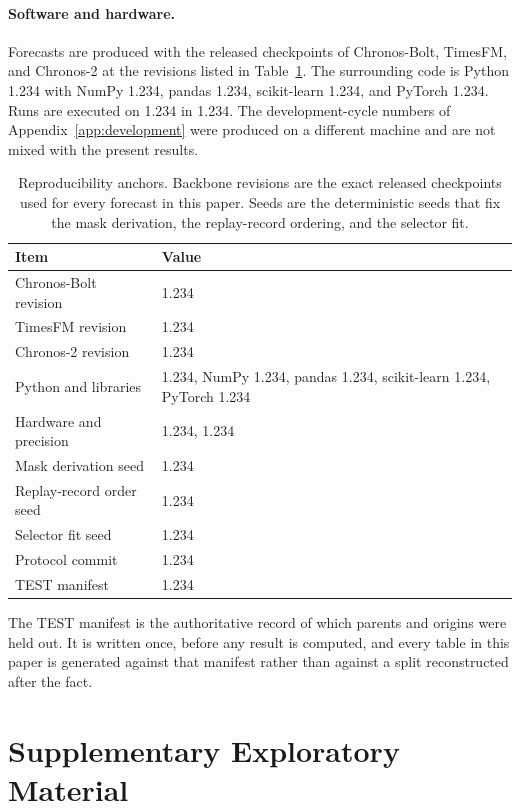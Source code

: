 \documentclass{article}
\begin{document}
\paragraph{Software and hardware.} Forecasts are produced with the released checkpoints of
Chronos-Bolt, TimesFM, and Chronos-2 at the revisions listed in Table~\ref{tab:app-repro}.
The surrounding code is Python 1.234 with NumPy 1.234, pandas
1.234, scikit-learn 1.234, and PyTorch 1.234. Runs are
executed on 1.234 in 1.234. The development-cycle numbers of
Appendix~\ref{app:development} were produced on a different machine and are not mixed with the
present results.

\begin{table}[h]
  \caption{Reproducibility anchors. Backbone revisions are the exact released checkpoints used
  for every forecast in this paper. Seeds are the deterministic seeds that fix the mask
  derivation, the replay-record ordering, and the selector fit.}
  \label{tab:app-repro}
  \centering
  \small
  \setlength{\tabcolsep}{4pt}
  \begin{tabular}{@{}l p{}@{}}
    \toprule
    Item & Value \\
    \midrule
    Chronos-Bolt revision   & 1.234 \\
    TimesFM revision        & 1.234 \\
    Chronos-2 revision      & 1.234 \\
    Python and libraries    & 1.234, NumPy 1.234, pandas 1.234, scikit-learn 1.234, PyTorch 1.234 \\
    Hardware and precision  & 1.234, 1.234 \\
    Mask derivation seed    & 1.234 \\
    Replay-record order seed & 1.234 \\
    Selector fit seed       & 1.234 \\
    Protocol commit         & 1.234 \\
    TEST manifest           & 1.234 \\
    \bottomrule
  \end{tabular}
\end{table}

The TEST manifest is the authoritative record of which parents and origins were held out. It
is written once, before any result is computed, and every table in this paper is generated
against that manifest rather than against a split reconstructed after the fact.

\section*{Supplementary Exploratory Material}
\label{app:supplementary}
\end{document}
